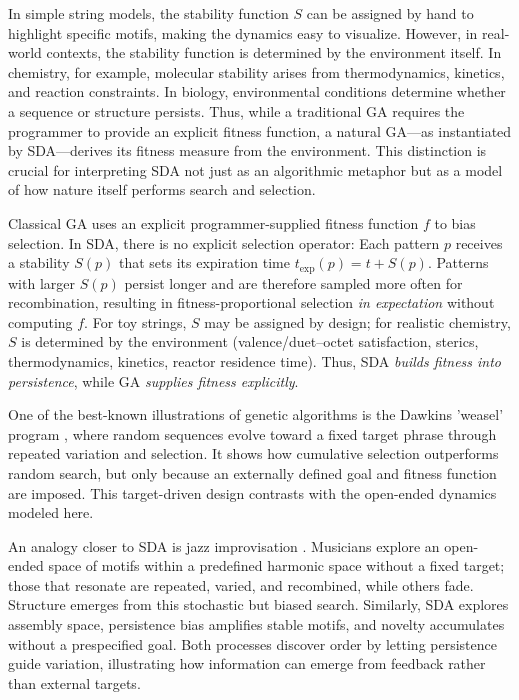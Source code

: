 \documentclass[life,article,submit,pdftex,moreauthors]{Definitions/mdpi}
\begin{document}
In simple string models, the stability function $S$ can be assigned by hand to highlight specific motifs, making the dynamics easy to visualize. However, in real-world contexts, the stability
function is determined by the environment itself. In chemistry, for example, molecular stability 
arises from thermodynamics, kinetics, and reaction constraints. In biology, environmental conditions 
determine whether a sequence or structure persists. Thus, while a traditional GA requires the 
programmer to provide an explicit fitness function, a natural GA---as instantiated by SDA---derives 
its fitness measure from the environment. This distinction is crucial for interpreting SDA not just as an algorithmic metaphor but as a model of how nature itself performs search and selection.

Classical GA uses an explicit programmer-supplied fitness function $f$ to bias selection. 
In SDA, there is no explicit selection operator: Each pattern $p$ receives a stability
$S(p)$ that sets its expiration time $t_{\exp}(p)=t+S(p)$. Patterns with larger $S(p)$ 
persist longer and are therefore sampled more often for recombination, resulting in fitness-proportional selection \emph{in expectation} without computing $f$. 
For toy strings, $S$ may be assigned by design; for realistic chemistry, $S$ is determined 
by the environment (valence/duet–octet satisfaction, sterics, thermodynamics, kinetics, 
reactor residence time). Thus, SDA \emph{builds fitness into persistence}, while GA
\emph{supplies fitness explicitly}.

One of the best-known illustrations of genetic algorithms is the Dawkins 'weasel' program \cite{dawkins1986blind}, where random sequences evolve
toward a fixed target phrase through repeated variation and selection. 
It shows how cumulative selection outperforms random search, but only
because an externally defined goal and fitness function are imposed. 
This target-driven design contrasts with the open-ended dynamics modeled
here.  

An analogy closer to SDA is jazz improvisation \cite{adler2025jazz}. 
Musicians explore an open-ended space of motifs within a predefined harmonic space
without a fixed target; 
those that resonate are repeated, varied, and recombined, while others
fade. Structure emerges from this stochastic but biased search. 
Similarly, SDA explores assembly space, persistence bias amplifies
stable motifs, and novelty accumulates without a prespecified goal. 
Both processes discover order by letting persistence guide variation, 
illustrating how information can emerge from feedback rather than
external targets.
\end{document}
